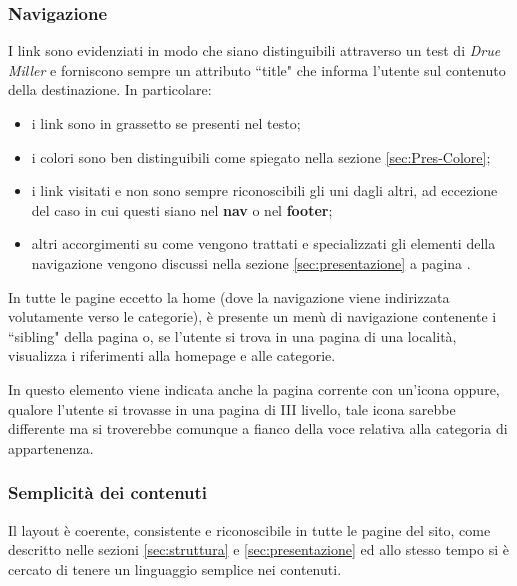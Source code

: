 \subsubsection{Navigazione}
I link sono evidenziati in modo che siano distinguibili attraverso un test di \textit{Drue Miller} e forniscono sempre un attributo ``title" che informa
l'utente sul contenuto della destinazione.
In particolare:
\begin{itemize}
\item i link sono in grassetto se presenti nel testo;
\item i colori sono ben distinguibili come spiegato nella sezione \ref{sec:Pres-Colore};
\item i link visitati e non sono sempre riconoscibili gli uni dagli altri, ad
eccezione del caso in cui questi siano nel \textbf{nav} o nel \textbf{footer};
\item altri accorgimenti su come vengono trattati e specializzati gli elementi
della navigazione vengono discussi nella sezione \ref{sec:presentazione} a pagina \pageref{sec:presentazione}.
\end{itemize}

In tutte le pagine eccetto la home (dove la navigazione viene indirizzata
volutamente verso le categorie), è presente un menù di navigazione contenente
i ``sibling" della pagina o, se l'utente si trova in una pagina di una
località, visualizza i riferimenti alla homepage e alle categorie.

In questo elemento viene indicata anche la pagina corrente con un'icona
oppure, qualore l'utente si trovasse in una pagina di III livello, tale icona
sarebbe differente ma si troverebbe comunque a fianco della voce relativa alla
categoria di appartenenza.

\subsubsection{Semplicità dei contenuti}
Il layout è coerente, consistente e riconoscibile in tutte le pagine del sito,
come descritto nelle sezioni \ref{sec:struttura} e \ref{sec:presentazione} ed
allo stesso tempo si è cercato di tenere un linguaggio semplice nei contenuti.
